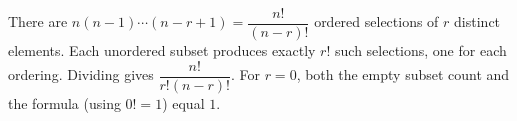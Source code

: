 There are $n(n-1)\cdots(n-r+1)=\dfrac{n!}{(n-r)!}$ ordered selections of $r$ distinct elements. Each unordered subset produces exactly $r!$ such selections, one for each ordering. Dividing gives $\dfrac{n!}{r!(n-r)!}$. For $r=0$, both the empty subset count and the formula (using $0!=1$) equal $1$.
